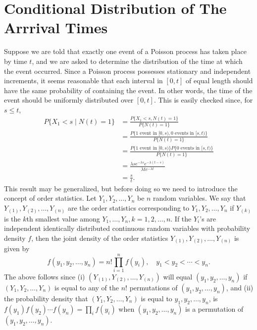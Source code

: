 \documentclass[lang=cn,10pt,thmcnt=section]{elegantbook}
\begin{document}
\section{Conditional Distribution of The Arrrival Times}
Suppose we are told that exactly one event of a Poisson process has taken place by time $t$, and we are asked to determine the distribution of the time at which the event occurred. Since a Poisson process possesses stationary and independent increments, it seems reasonable that each interval in $[0, t]$ of equal length should have the same probability of containing the event. In other words, the time of the event should be uniformly distributed over $[0, t]$. This is easily checked since, for $s \leq t$,
\begin{align*}
	P\{X_1 < s \mid N(t) = 1\} &= \frac{P\{X_1 < s, N(t) = 1\}}{P\{N(t) = 1\}} \\
	&= \frac{P\{\text{1 event in } [0, s), \text{0 events in } [s, t)\}}{P\{N(t) = 1\}} \\
	&= \frac{P\{\text{1 event in } [0, s)\} P\{\text{0 events in } [s, t)\}}{P\{N(t) = 1\}} \\
	&= \frac{\lambda s e^{-\lambda s} e^{-\lambda (t-s)}}{\lambda t e^{-\lambda t}} \\
	&= \frac{s}{t}.
	\end{align*}
This result may be generalized, but before doing so we need to introduce the concept of order statistics. Let $Y_1, Y_2, \ldots, Y_n$ be $n$ random variables. We say that $Y_{(1)}, Y_{(2)}, \ldots, Y_{(n)}$ are the order statistics corresponding to $Y_1, Y_2, \ldots, Y_n$ if $Y_{(k)}$ is the $k$th smallest value among $Y_1, \ldots, Y_n, k = 1, 2, \ldots, n$. If the $Y_i$'s are independent identically distributed continuous random variables with probability density $f$, then the joint density of the order statistics $Y_{(1)}, Y_{(2)}, \ldots, Y_{(n)}$ is given by
\[
f(y_1, y_2, \ldots, y_n) = n! \prod_{i=1}^{n} f(y_i), \quad y_1 < y_2 < \cdots < y_n.
\]
The above follows since (i) $(Y_{(1)}, Y_{(2)}, \ldots, Y_{(n)})$ will equal $(y_1, y_2, \ldots, y_n)$ if $(Y_1, Y_2, \ldots, Y_n)$ is equal to any of the $n!$ permutations of $(y_1, y_2, \ldots, y_n)$, and (ii) the probability density that $(Y_1, Y_2, \ldots, Y_n)$ is equal to $y_1, y_2, \ldots, y_n$, is $f(y_1) f(y_2) \cdots f(y_n) = \prod_{i} f(y_i)$ when $(y_1, y_2, \ldots, y_n)$ is a permutation of $(y_1, y_2, \ldots, y_n)$.
\end{document}
